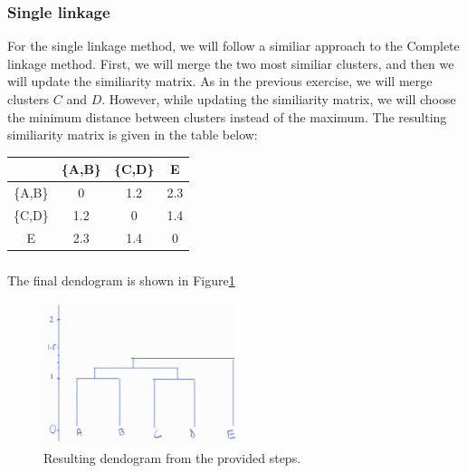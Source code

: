 \documentclass{article}
\begin{document}
\subsubsection{Single linkage}
For the single linkage method, we will follow a similiar approach to the Complete linkage method. First, we will merge the two most similiar clusters, and then we will update the similiarity matrix. As in the previous exercise, we will merge clusters $C$ and $D$. However, while updating the similiarity matrix, we will choose the minimum distance between clusters instead of the maximum. The resulting similiarity matrix is given in the table below:

\begin{center}
    \begin{tabular}{c|ccc}
          & \{A,B\} & \{C,D\} & E \\
    \hline
    \{A,B\} & 0     & 1.2   & 2.3 \\
    \{C,D\} & 1.2   & 0     & 1.4 \\
    E       & 2.3   & 1.4   & 0   \\
    \end{tabular}
\end{center}

\subsubsection{}
The final dendogram is shown in Figure\ref{fig:dendogram}
\begin{figure}[h!]
    \centering
    \includegraphics[width=0.5\textwidth]{dendogram.png}
    \caption{Resulting dendogram from the provided steps.}
    \label{fig:dendogram}
\end{figure}

\clearpage

% 
% 

\end{document}
